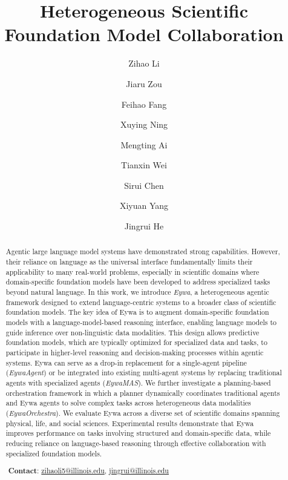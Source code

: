 \documentclass{llmxive}
\title{Heterogeneous Scientific Foundation Model Collaboration}
\author{Zihao Li \and Jiaru Zou \and Feihao Fang \and Xuying Ning \and Mengting Ai \and Tianxin Wei \and Sirui Chen \and Xiyuan Yang \and Jingrui He}
\begin{document}
\maketitle
\begin{abstract}
Agentic large language model systems have demonstrated strong capabilities.
However, their reliance on language as the universal interface fundamentally limits their applicability to many real-world problems, especially in scientific domains where 
domain-specific foundation models have been developed to address specialized tasks beyond natural language. 
In this work, we introduce \textit{Eywa}, a heterogeneous agentic framework designed to extend language-centric systems to a broader class of scientific foundation models. The key idea of Eywa is to augment domain-specific foundation models with a language-model-based reasoning interface, enabling language models to guide inference over non-linguistic data modalities. This design allows predictive foundation models, which are typically optimized for specialized data and tasks, to participate in higher-level reasoning and decision-making processes within agentic systems.
Eywa can serve as a drop-in replacement for a single-agent pipeline (\textit{EywaAgent}) or be integrated into existing multi-agent systems by replacing traditional agents with specialized agents (\textit{EywaMAS}). We further investigate a planning-based orchestration framework in which a planner dynamically coordinates traditional agents and Eywa agents to solve complex tasks across heterogeneous data modalities (\textit{EywaOrchestra}).
We evaluate Eywa across a diverse set of scientific domains spanning physical, life, and social sciences. 
Experimental results demonstrate that Eywa improves performance on tasks involving structured and domain-specific data, while reducing reliance on language-based reasoning through effective collaboration with specialized foundation models.

\vspace{2mm}
${}$ \textbf{Contact}: \href{mailto:zihaoli5@illinois.edu}{{\color{blue}zihaoli5@illinois.edu}}, \href{mailto:jingrui@illinois.edu}{{\color{blue}jingrui@illinois.edu}}
\end{abstract}
\end{document}
